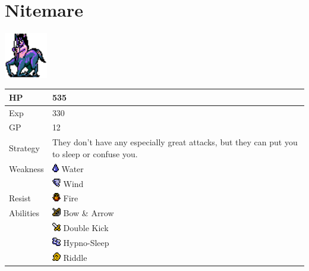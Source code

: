 \section{Nitemare}
\label{monster:nitemare}

\includegraphics[height=2cm,keepaspectratio]{./resources/monster/nitemare}

\begin{longtable}{ l p{9cm} }
	HP
	& 535
\\ \hline
	Exp
	& 330
\\ \hline
	GP
	& 12
\\ \hline
	Strategy
	& They don't have any especially great attacks, but they can put you to sleep or confuse you.
\\ \hline
	Weakness
	& \includegraphics[height=1em,keepaspectratio]{./resources/effects/water} Water \\
	& \includegraphics[height=1em,keepaspectratio]{./resources/effects/wind} Wind
\\ \hline
	Resist
	& \includegraphics[height=1em,keepaspectratio]{./resources/effects/fire} Fire
\\ \hline
	Abilities
	& \includegraphics[height=1em,keepaspectratio]{./resources/effects/shoot} Bow \& Arrow \\
	& \includegraphics[height=1em,keepaspectratio]{./resources/effects/damage} Double Kick \\
	& \includegraphics[height=1em,keepaspectratio]{./resources/effects/sleep} Hypno-Sleep \\
	& \includegraphics[height=1em,keepaspectratio]{./resources/effects/confusion} Riddle
\end{longtable}
